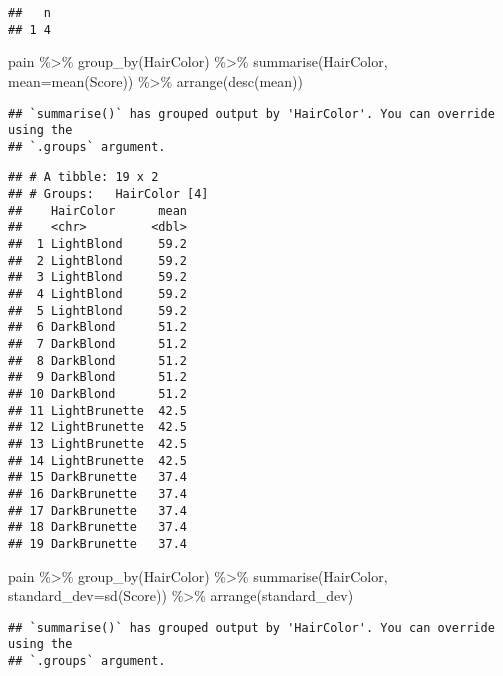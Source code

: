 \documentclass[
]{article}
\newenvironment{Shaded}{\begin{snugshade}}{\end{snugshade}}
\newcommand{\AttributeTok}[1]{\textcolor[rgb]{0.77,0.63,0.00}{#1}}
\newcommand{\FunctionTok}[1]{\textcolor[rgb]{0.00,0.00,0.00}{#1}}
\newcommand{\NormalTok}[1]{#1}
\newcommand{\SpecialCharTok}[1]{\textcolor[rgb]{0.00,0.00,0.00}{#1}}
\begin{document}
\begin{verbatim}
##   n
## 1 4
\end{verbatim}

\begin{Shaded}
\begin{Highlighting}[]
\NormalTok{pain }\SpecialCharTok{\%\textgreater{}\%}
  \FunctionTok{group\_by}\NormalTok{(HairColor) }\SpecialCharTok{\%\textgreater{}\%}
  \FunctionTok{summarise}\NormalTok{(HairColor, }\AttributeTok{mean=}\FunctionTok{mean}\NormalTok{(Score)) }\SpecialCharTok{\%\textgreater{}\%}
  \FunctionTok{arrange}\NormalTok{(}\FunctionTok{desc}\NormalTok{(mean))}
\end{Highlighting}
\end{Shaded}

\begin{verbatim}
## `summarise()` has grouped output by 'HairColor'. You can override using the
## `.groups` argument.
\end{verbatim}

\begin{verbatim}
## # A tibble: 19 x 2
## # Groups:   HairColor [4]
##    HairColor      mean
##    <chr>         <dbl>
##  1 LightBlond     59.2
##  2 LightBlond     59.2
##  3 LightBlond     59.2
##  4 LightBlond     59.2
##  5 LightBlond     59.2
##  6 DarkBlond      51.2
##  7 DarkBlond      51.2
##  8 DarkBlond      51.2
##  9 DarkBlond      51.2
## 10 DarkBlond      51.2
## 11 LightBrunette  42.5
## 12 LightBrunette  42.5
## 13 LightBrunette  42.5
## 14 LightBrunette  42.5
## 15 DarkBrunette   37.4
## 16 DarkBrunette   37.4
## 17 DarkBrunette   37.4
## 18 DarkBrunette   37.4
## 19 DarkBrunette   37.4
\end{verbatim}

\begin{Shaded}
\begin{Highlighting}[]
\NormalTok{pain }\SpecialCharTok{\%\textgreater{}\%}
  \FunctionTok{group\_by}\NormalTok{(HairColor) }\SpecialCharTok{\%\textgreater{}\%}
  \FunctionTok{summarise}\NormalTok{(HairColor, }\AttributeTok{standard\_dev=}\FunctionTok{sd}\NormalTok{(Score)) }\SpecialCharTok{\%\textgreater{}\%}
  \FunctionTok{arrange}\NormalTok{(standard\_dev)}
\end{Highlighting}
\end{Shaded}

\begin{verbatim}
## `summarise()` has grouped output by 'HairColor'. You can override using the
## `.groups` argument.
\end{verbatim}
\end{document}
